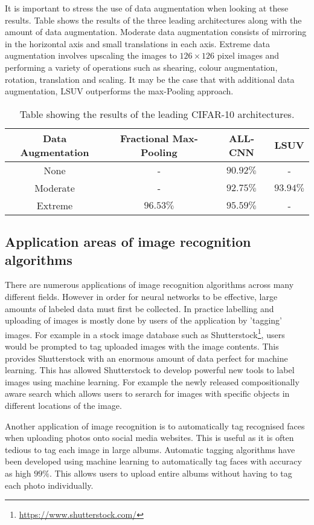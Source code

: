 It is important to stress the use of data augmentation when looking at these results. Table \label{tab:SOA_res} shows the results of the three leading architectures along with the amount of data augmentation. Moderate data augmentation consists of mirroring in the horizontal axis and small translations in each axis. Extreme data augmentation involves upscaling the images to $126\times126$ pixel images and performing a variety of operations such as shearing, colour augmentation, rotation, translation and scaling. It may be the case that with additional data augmentation, LSUV outperforms the max-Pooling approach.

\begin{table}[h]
\begin{center}
 \begin{tabular}{||c || c c c||}
 \hline
 Data Augmentation & Fractional Max-Pooling & ALL-CNN & LSUV \\ [0.5ex]
 \hline\hline
 None & - & $90.92\%$ & - \\
 \hline
 Moderate & - & $92.75\%$ & $93.94\%$\\
 \hline
 Extreme & $96.53\%$ & $95.59\%$ & - \\ [1ex]
 \hline

\end{tabular}
\caption{Table showing the results of the leading CIFAR-10 architectures.}
\end{center}
\end{table}


\subsection{Application areas of image recognition algorithms}
\label{sec:Application_img_rec}

There are numerous applications of image recognition algorithms across many different fields. However in order for neural networks to be effective, large amounts of labeled data must first be collected. In practice labelling and uploading of images is mostly done by users of the application by 'tagging' images. For example in a stock image database such as Shutterstock\footnote{\url{https://www.shutterstock.com/}}, users would be prompted to tag uploaded images with the image contents. This provides Shutterstock with an enormous amount of data perfect for machine learning. This has allowed Shutterstock to develop powerful new tools to label images using machine learning. For example the newly released compositionally aware search which allows users to serarch for images with specific objects in different locations of the image\cite{ranzingercomposition}.

Another application of image recognition is to automatically tag recognised faces when uploading photos onto social media websites. This is useful as it is often tedious to tag each image in large albums. Automatic tagging algorithms have been developed using machine learning to automatically tag faces with accuracy as high $99\%$\cite{schroff2015facenet}. This allows users to upload entire albums without having to tag each photo individually.

